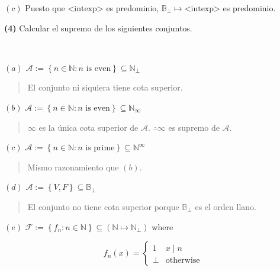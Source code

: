 \documentclass[a4paper, 12pt]{article}
\begin{document}
$(c)$ Puesto que $\text{<intexp>}$ es predominio,
$\mathbb{B}_\bot \mapsto \text{<intexp>}$ es predominio.


\pagebreak 

\begin{myframe}
\textbf{(4)} Calcular el supremo de los siguientes conjuntos.
\end{myframe}

~ 

$(a)$ $\mathcal{A} := \left\{ n \in \mathbb{N} : n \text{ is even} \right\}
\subseteq \mathbb{N}_{\bot} $


\small
\begin{quote}

  El conjunto ni siquiera tiene cota superior. 

\end{quote}
\normalsize

$(b)$ $\mathcal{A} := \left\{ n \in \mathbb{N} : n \text{ is even} \right\}
\subseteq \mathbb{N}_{\infty} $


\small
\begin{quote}

$\infty $ es la única cota superior de $\mathcal{A}$. $\therefore \infty$ es
supremo de $\mathcal{A}$.

\end{quote}
\normalsize


$(c)$ $\mathcal{A} := \left\{ n \in \mathbb{N} : n \text{ is prime} \right\}
\subseteq \mathbb{N}^\infty$


\small
\begin{quote}

Mismo razonamiento que $(b)$.

\end{quote}
\normalsize


$(d)$ $\mathcal{A} := \left\{ V, F \right\} \subseteq \mathbb{B}_\bot$


\small
\begin{quote}

El conjunto no tiene cota superior porque $\mathbb{B}_\bot $ es el orden llano.

\end{quote}
\normalsize


$(e)$ $\mathcal{F} := \left\{ f_n : n \in \mathbb{N} \right\} \subseteq
\left( \mathbb{N} \mapsto \mathbb{N}_\bot  \right) $ where 

\begin{equation*}
  f_n(x) = \begin{cases}
    1 & x \mid n \\ 
    \bot & \text{otherwise}
  \end{cases}
\end{equation*}
\end{document}
